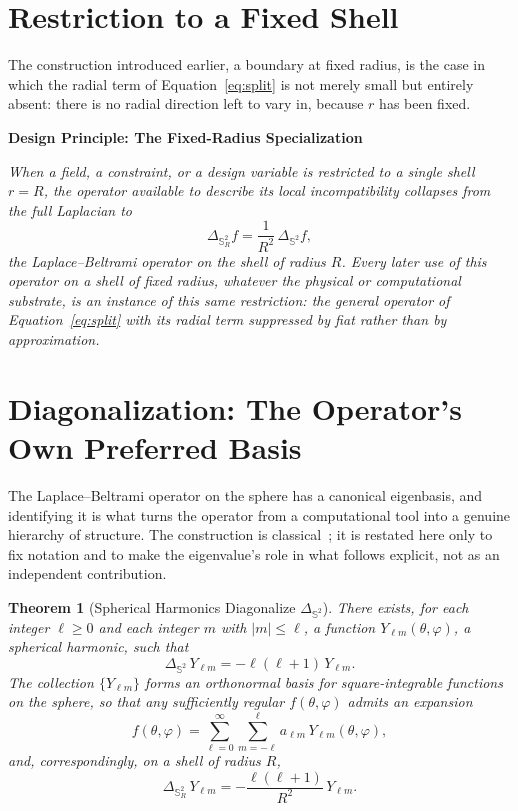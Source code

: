 \documentclass[11pt,fleqn]{book}
\numberwithin{equation}{chapter}
\newenvironment{principle}[1]
  {\begin{principleEnv}
   \noindent\textbf{Design Principle: #1}\par\smallskip\itshape}
  {\end{principleEnv}}
\theoremstyle{plain}
\newtheorem{theorem}{Theorem}[chapter]
\theoremstyle{definition}
\theoremstyle{remark}
\newcommand{\Sphere}{\mathbb{S}^{2}}
\begin{document}
\section{Restriction to a Fixed Shell}

The construction introduced earlier, a boundary at fixed radius, is the case in which the radial term of Equation~\eqref{eq:split} is not merely small but entirely absent: there is no radial direction left to vary in, because \(r\) has been fixed.

\begin{principle}{The Fixed-Radius Specialization}
When a field, a constraint, or a design variable is restricted to a single shell \(r=R\), the operator available to describe its local incompatibility collapses from the full Laplacian to
\[
\Delta_{\Sphere_R} f = \frac{1}{R^2}\,\Delta_{\Sphere} f,
\]
the Laplace--Beltrami operator on the shell of radius \(R\). Every later use of this operator on a shell of fixed radius, whatever the physical or computational substrate, is an instance of this same restriction: the general operator of Equation~\eqref{eq:split} with its radial term suppressed by fiat rather than by approximation.
\end{principle}

\section{Diagonalization: The Operator's Own Preferred Basis}

The Laplace--Beltrami operator on the sphere has a canonical eigenbasis, and identifying it is what turns the operator from a computational tool into a genuine hierarchy of structure. The construction is classical~\cite{muller1966}; it is restated here only to fix notation and to make the eigenvalue's role in what follows explicit, not as an independent contribution.

\begin{theorem}[Spherical Harmonics Diagonalize \texorpdfstring{\(\Delta_{\Sphere}\)}{the angular Laplacian}]
There exists, for each integer \(\ell\geq 0\) and each integer \(m\) with \(|m|\leq \ell\), a function \(Y_{\ell m}(\theta,\varphi)\), a spherical harmonic, such that
\[
\Delta_{\Sphere}\, Y_{\ell m} = -\ell(\ell+1)\, Y_{\ell m}.
\]
The collection \(\{Y_{\ell m}\}\) forms an orthonormal basis for square-integrable functions on the sphere, so that any sufficiently regular \(f(\theta,\varphi)\) admits an expansion
\[
f(\theta,\varphi) = \sum_{\ell=0}^{\infty}\sum_{m=-\ell}^{\ell} a_{\ell m}\, Y_{\ell m}(\theta,\varphi),
\]
and, correspondingly, on a shell of radius \(R\),
\[
\Delta_{\Sphere_R}\, Y_{\ell m} = -\frac{\ell(\ell+1)}{R^2}\, Y_{\ell m}.
\]
\end{theorem}
\end{document}
